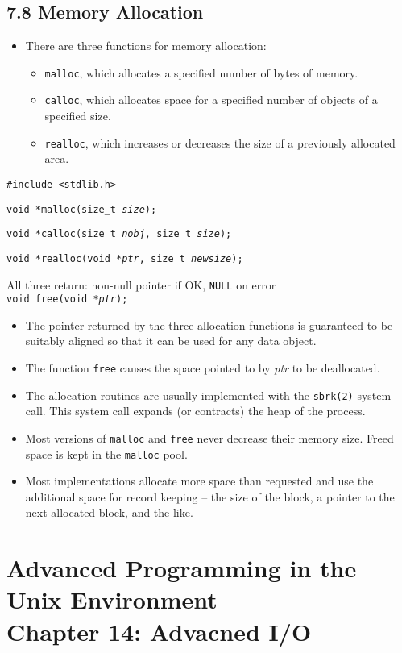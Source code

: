 \documentclass[]{article}
\newcommand{\code}{\texttt}
\begin{document}
\subsection*{7.8 Memory Allocation}
\begin{itemize}
\item There are three functions for memory allocation:
\begin{itemize}
\item \code{malloc}, which allocates a specified number of bytes of memory.
\item \code{calloc}, which allocates space for a specified number of objects of
a specified size.
\item \code{realloc}, which increases or decreases the size of a previously
allocated area.
\end{itemize}
\end{itemize}

\code{\#include <stdlib.h>}

\code{void *malloc(size\_t \emph{size});}

\code{void *calloc(size\_t \emph{nobj}, size\_t \emph{size});}

\code{void *realloc(void *\emph{ptr}, size\_t \emph{newsize});}

All three return: non-null pointer if OK, \code{NULL} on error \\

\code{void free(void *\emph{ptr});}

\begin{itemize}
\item The pointer returned by the three allocation functions is guaranteed to be
suitably aligned so that it can be used for any data object.
\item The function \code{free} causes the space pointed to by \emph{ptr} to be
deallocated.
\item The allocation routines are usually implemented with the \code{sbrk(2)}
system call. This system call expands (or contracts) the heap of the process.
\item Most versions of \code{malloc} and \code{free} never decrease their memory
size. Freed space is kept in the \code{malloc} pool.
\item Most implementations allocate more space than requested and use the
additional space for record keeping -- the size of the block, a pointer to the
next allocated block, and the like.
\end{itemize}

\section*{Advanced Programming in the Unix Environment \\
Chapter 14: Advacned I/O}
\end{document}
